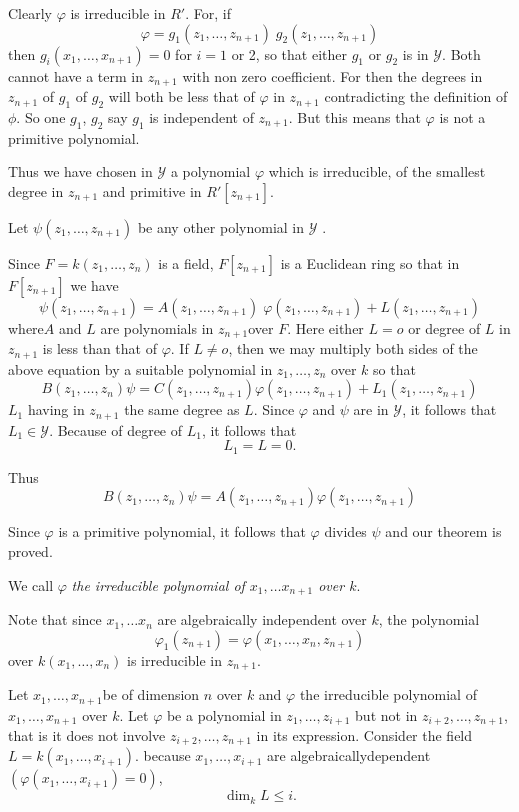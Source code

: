 Clearly $\varphi$ is irreducible in $R'$. For, if
$$
\varphi=g_1(z_1,\ldots,z_{n+1}) \; g_2(z_1,\ldots,z_{n+1})
$$
then $g_i(x_1,\ldots ,x_{n+1})=0$ for $i=1$ or 2, so that either
$g_1$ or $g_2$ is in $\mathscr{Y}$. Both cannot have a term in
$z_{n+1}$ with non zero coefficient. For then the degrees in $z_{n+1}$
of $g_1$ of $g_2$ will both be less that of $\varphi$ in $z_{n+1}$
contradicting the definition of $\phi$. So one $g_1$, $g_2$ say
$g_1$ is independent of $z_{n+1}$. But this means that $\varphi$ is not
a primitive polynomial. 

Thus we have chosen in $\mathscr{Y}$  a polynomial $\varphi$ which is
irreducible, of the smallest degree in $z_{n+1}$ and primitive in
$R'[z_{n+1}]$. 

Let $\psi(z_1,\ldots,z_{n+1})$ be any other polynomial in $\mathscr{Y}$ .

Since $F=k(z_1,\ldots,z_n)$ is a field, $F[z_{n+1}]$ is a Euclidean
ring so that in $F[z_{n+1}]$ we have  
$$
\psi(z_1,\ldots, z_{n+1}) = A(z_1,\ldots,z_{n+1}) \; 
\varphi(z_1,\ldots,z_{n+1}) + L(z_1,\ldots,z_{n+1}) 
$$
where\pageoriginale $A$ and $L$ are polynomials in $z_{n+1}$over
$F$. Here either 
$L=o$ or degree of $L$ in $z_{n+1}$ is less than that of $\varphi$. If
$L \neq o$, then we may multiply both sides of the above equation by a
suitable polynomial in $z_1,\ldots,z_n$ over $k$ so that 
$$
B(z_1,\ldots,z_n) \psi =
C(z_1,\ldots,z_{n+1})\varphi(z_1,\ldots,z_{n+1})+L_1(z_1,\ldots,z_{n+1}) 
$$
$L_1$ having in $z_{n+1}$ the same degree as $L$. Since $\varphi$ and
$\psi$ are in $\mathscr{Y}$, it follows that $L_1 \in
\mathscr{Y}$. Because of degree of $L_1$, it follows that 
$$
L_1 = L=0.
$$
 
Thus
$$
B(z_1,\ldots,z_n) \psi=A(z_1,\ldots,z_{n+1})\varphi(z_1,\ldots,z_{n+1})
$$ 

Since $\varphi$ is a primitive polynomial, it follows that $\varphi$
divides $\psi$ and our theorem is proved. 

We call $\varphi$ \textit{the irreducible polynomial of $x_1,\ldots
  x_{n+1}$ over $k$}. 

Note that since $x_1,\ldots x_n$ are algebraically independent over
$k$, the polynomial 
$$
\varphi_1(z_{n+1})=\varphi(x_1,\ldots,x_n,z_{n+1})
$$
over $k(x_1,\ldots,x_n)$ is irreducible in $z_{n+1}$.

Let $x_1,\ldots,x_{n+1}$be of dimension $n$ over $k$ and $\varphi$ the
irreducible polynomial of $x_1,\ldots,x_{n+1}$ over $k$. Let $\varphi$
be a polynomial in $z_1,\ldots,z_{i+1}$ but not in
$z_{i+2},\ldots,z_{n+1}$, that is it does not involve
$z_{i+2},\ldots,z_{n+1}$ in its expression. Consider the field
$L=k(x_1,\ldots,x_{i+1})$. because $x_1,\ldots,x_{i+1}$ are
algebraically\pageoriginale dependent $(\varphi(x_1,\ldots,x_{i+1})=0)$, 
$$
\dim_k L \leq i.
$$

